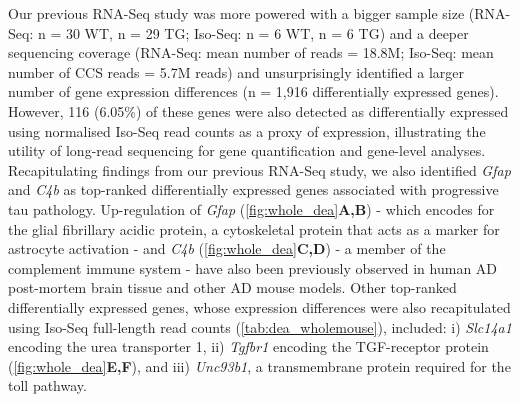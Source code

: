 Our previous RNA-Seq study\cite{Castanho2020} was more powered with a bigger sample size (RNA-Seq: n = 30 WT, n = 29 TG; Iso-Seq: n = 6 WT, n = 6 TG) and a deeper sequencing coverage (RNA-Seq: mean number of reads = 18.8M; Iso-Seq: mean number of CCS reads = 5.7M reads) and unsurprisingly identified a larger number of gene expression differences (n = 1,916 differentially expressed genes). However, 116 (6.05\%) of these genes were also detected as differentially expressed using normalised Iso-Seq read counts as a proxy of expression, illustrating the utility of long-read sequencing for gene quantification and gene-level analyses. Recapitulating findings from our previous RNA-Seq study, we also identified \textit{Gfap} and \textit{C4b} as top-ranked differentially expressed genes associated with progressive tau pathology. Up-regulation of \textit{Gfap} (\cref{fig:whole_dea}\textbf{A,B}) - which encodes for the glial fibrillary acidic protein, a cytoskeletal protein that acts as a marker for astrocyte activation - and \textit{C4b} (\cref{fig:whole_dea}\textbf{C,D}) - a member of the complement immune system - have also been previously observed in human AD post-mortem brain tissue and other AD mouse models\cite{Muramori1998,Ishiki2016, Chatterjee2021}. Other top-ranked differentially expressed genes, whose expression differences were also recapitulated using Iso-Seq full-length read counts (\cref{tab:dea_wholemouse}), included: i) \textit{Slc14a1}\cite{Castillo2017} encoding the urea transporter 1, ii) \textit{Tgfbr1} encoding the TGF-\textbeta receptor protein (\cref{fig:whole_dea}\textbf{E,F}), and iii) \textit{Unc93b1}\cite{Wirz2013}, a transmembrane protein required for the toll pathway.

